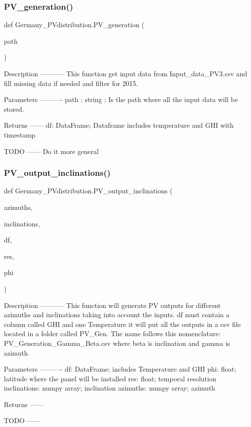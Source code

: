 \subsubsection{\texorpdfstring{P\+V\+\_\+generation()}{PV\_generation()}}
{\footnotesize\ttfamily def Germany\+\_\+\+P\+Vdistribution.\+P\+V\+\_\+generation (\begin{DoxyParamCaption}\item[{}]{path }\end{DoxyParamCaption})}

\begin{DoxyVerb}Description
-----------
This function get input data from Input_data_PV3.csv and fill missing data if needed and filter for 2015.

Parameters
----------
path : string ; Is the path where all the input data will be stored.

Returns
------
df: DataFrame; Dataframe includes temperature and GHI with timestamp

TODO
------
Do it more general
\end{DoxyVerb}
 \mbox{\label{namespace_germany___p_vdistribution_acc1f617f814d8015bf82d012c33f448a}} 
\subsubsection{\texorpdfstring{P\+V\+\_\+output\+\_\+inclinations()}{PV\_output\_inclinations()}}
{\footnotesize\ttfamily def Germany\+\_\+\+P\+Vdistribution.\+P\+V\+\_\+output\+\_\+inclinations (\begin{DoxyParamCaption}\item[{}]{azimuths,  }\item[{}]{inclinations,  }\item[{}]{df,  }\item[{}]{res,  }\item[{}]{phi }\end{DoxyParamCaption})}

\begin{DoxyVerb}Description
-----------
This function will generate PV outputs for different azimuths and inclinations taking into account the inputs. df must contain a column called GHI and one Temperature it will put all the outputs in a csv file located in a folder called PV_Gen. The name follows this nomenclature: PV_Generation_Gamma_Beta.csv where beta is inclination and gamma is azimuth

Parameters
----------
df: DataFrame; includes Temperature and GHI
phi: float; latitude where the panel will be installed
res: float; temporal resolution
inclinations: numpy array; inclination
azimuths: numpy array; azimuth

Returns
------

TODO
------
\end{DoxyVerb}
 